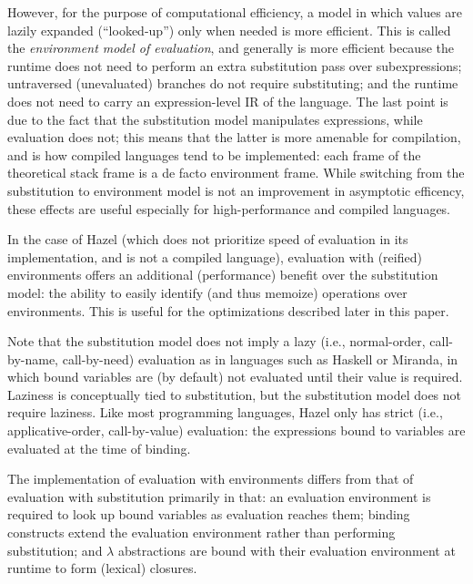 However, for the purpose of computational efficiency, a model in which values are lazily expanded (``looked-up'') only when needed is more efficient. This is called the \textit{environment model of evaluation}, and generally is more efficient because the runtime does not need to perform an extra substitution pass over subexpressions; untraversed (unevaluated) branches do not require substituting; and the runtime does not need to carry an expression-level IR of the language. The last point is due to the fact that the substitution model manipulates expressions, while evaluation does not; this means that the latter is more amenable for compilation, and is how compiled languages tend to be implemented: each frame of the theoretical stack frame is a de facto environment frame. While switching from the substitution to environment model is not an improvement in asymptotic efficency, these effects are useful especially for high-performance and compiled languages.

In the case of Hazel (which does not prioritize speed of evaluation in its implementation, and is not a compiled language), evaluation with (reified) environments offers an additional (performance) benefit over the substitution model: the ability to easily identify (and thus memoize) operations over environments. This is useful for the optimizations described later in this paper.

Note that the substitution model does not imply a lazy (i.e., normal-order, call-by-name, call-by-need) evaluation as in languages such as Haskell or Miranda, in which bound variables are (by default) not evaluated until their value is required. Laziness is conceptually tied to substitution, but the substitution model does not require laziness. Like most programming languages, Hazel only has strict (i.e., applicative-order, call-by-value) evaluation: the expressions bound to variables are evaluated at the time of binding.


The implementation of evaluation with environments differs from that of evaluation with substitution primarily in that: an evaluation environment is required to look up bound variables as evaluation reaches them; binding constructs extend the evaluation environment rather than performing substitution; and $\lambda$ abstractions are bound with their evaluation environment at runtime to form (lexical) closures.

